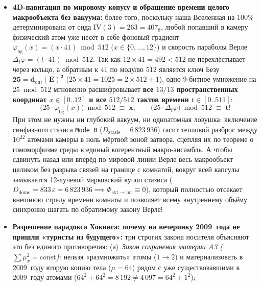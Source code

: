 \begin{enumerate}[label=\textbf{\arabic*.},leftmargin=*]
\begin{itemize}[noitemsep]
    \[
      \bigl(\varphi_{\mathrm{drive}} - \varphi_{\mathrm{atom}}\bigr)\bmod 512
      \;=\;
      \bigl(\varphi_{\mathrm{atom}} + \Delta\varphi_{\mathrm{mode}} - \varphi_{\mathrm{atom}}\bigr)\bmod 512
      \;\equiv\; \mathbf{\Delta\varphi_{\mathrm{mode}}}
      \qquad\Longrightarrow\qquad
      D\bigl(\Delta\varphi_{\mathrm{mode}}=139\bigr) \;\equiv\; \mathbf{8\,192}
      \;\;\forall\,\varphi_{\mathrm{atom}}\in\mathbb{Z}_{512}!
    \]
  \item \textbf{4D-навигация по мировому конусу и обращение времени целого макрообъекта без вакуума:}
    более того, поскольку наша Вселенная на 100\% детерминирована от сида $\mathrm{IV}(3) = 263 = 407_8$, любой попавший в камеру физический атом уже несёт в себе фоновый градиент $\varphi_{\mathrm{bg}}(x) = (x\cdot 41)\bmod 512$ ($x\in\{0,\dots,12\}$) и скорость параболы Верле $\Delta_t\varphi = (t\cdot 41)\bmod 512$. Так как $12\times 41 = 492 < 512$ не перехлёстывает через кольцо, а обратным к $41$ по модулю $512$ является ключ Безу $\mathbf{25 = d_{\mathrm{out}}(E)^2}$ ($25\times 41 = 1025 = 2\times 512 + 1$), одно 9-битное умножение на $25\bmod 512$ мгновенно расшифровывает \textbf{все $13/13$ пространственных координат $x\in[0..12]$ и все $512/512$ тактов времени $t\in[0..511]$}:
    \[
      \bigl(25\cdot \varphi_{\mathrm{bg}}(x)\bigr)\bmod 512 \;\equiv\; \mathbf{x},
      \qquad
      \bigl(25\cdot \Delta_t\varphi\bigr)\bmod 512 \;\equiv\; \mathbf{t}!
    \]
    При этом не нужны ни глубокий вакуум, ни одноатомная ловушка: включение синфазного стазиса \texttt{Mode~0} ($D_{\mathrm{stasis}} = 6\,823\,936$) гасит тепловой разброс между $10^{22}$ атомами камеры в ноль мёртвой зоной затвора, сцепляя их по теореме о гомоморфизме среды в единый когерентный макро-ансамбль. А чтобы сдвинуть назад или вперёд по мировой линии Верле весь макрообъект целиком без разрыва связей на границе с комнатой, вокруг всей капсулы замыкается 12-лучевой марковский купол стазиса ($D_{\mathrm{dome}} = 833\,\varepsilon = 6\,823\,936 \implies \Phi_{\mathrm{ext\to int}} \equiv 0$), который полностью отсекает внешнюю стрелу времени комнаты и позволяет всему внутреннему объёму синхронно шагать по обратимому закону Верле!
  \item \textbf{Разрешение парадокса Хокинга: почему на вечеринку 2009~года не пришли «туристы из будущего»:}
    три строгих закона носителя объясняют это без единого противоречия:
    (а)~\emph{Закон сохранения материи A3 ($\sum \mu_x^2 = \mathrm{const}$):} нельзя «размножить» атомы ($1\to 2$) и материализовать в 2009~году вторую копию тела ($\mu=64$) рядом с уже существовавшими в 2009~году атомами ($64^2+64^2 = 8\,192 \ne 4\,097 = 64^2+1^2$);

\end{itemize}
\end{enumerate}

